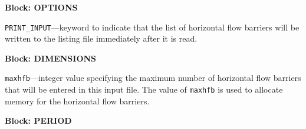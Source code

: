 
\item \textbf{Block: OPTIONS}

\begin{description}
\item \texttt{PRINT\_INPUT}---keyword to indicate that the list of horizontal flow barriers will be written to the listing file immediately after it is read.

\end{description}
\item \textbf{Block: DIMENSIONS}

\begin{description}
\item \texttt{maxhfb}---integer value specifying the maximum number of horizontal flow barriers that will be entered in this input file.  The value of \texttt{maxhfb} is used to allocate memory for the horizontal flow barriers.

\end{description}
\item \textbf{Block: PERIOD}

